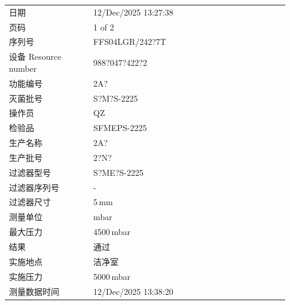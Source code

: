 \documentclass[UTF8,10pt,a4paper,fontset=fandol]{ctexart}
\newcommand{\fieldvalue}[1]{#1}
\begin{document}
\begin{tabular}{@{}p{0.28\linewidth}p{0.65\linewidth}@{}}
日期 &
\fieldvalue{12/Dec/2025 13:27:38}
\\
页码 &
\fieldvalue{1 of 2}
\\
序列号 &
\fieldvalue{FFS04LGR/242?7T}
\\
设备 Resource number &
\fieldvalue{988?047?422?2}
\\
功能编号 &
\fieldvalue{2A?}
\\
灭菌批号 &
\fieldvalue{S?M?S-2225}
\\
操作员 &
\fieldvalue{QZ}
\\
检验品 &
\fieldvalue{SFMEPS-2225}
\\
生产名称 &
\fieldvalue{2A?}
\\
生产批号 &
\fieldvalue{2?N?}
\\
过滤器型号 &
\fieldvalue{S?ME?S-2225}
\\
过滤器序列号 &
\fieldvalue{-}
\\
过滤器尺寸 &
\fieldvalue{5\,mm}
\\
测量单位 &
\fieldvalue{mbar}
\\
最大压力 &
\fieldvalue{4500\,mbar}
\\
结果 &
\fieldvalue{通过}
\\
实施地点 &
\fieldvalue{洁净室}
\\
实施压力 &
\fieldvalue{5000\,mbar}
\\
测量数据时间 &
\fieldvalue{12/Dec/2025 13:38:20}
\\
\end{tabular}
\end{document}
